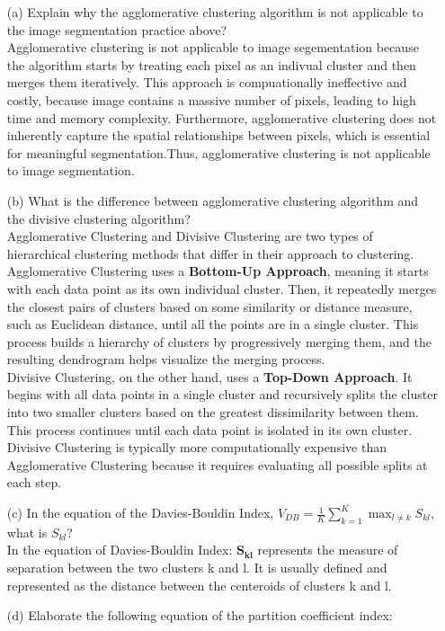 \documentclass[12pt,letterpaper]{article}
\begin{document}
\begin{itemize}
    \item[(a)] Explain why the agglomerative clustering algorithm is not applicable to the image segmentation practice above?
    \vspace{0.2in}
    \\ Agglomerative clustering is not applicable to image segementation because the algorithm starts by treating each pixel as an indivual 
    cluster and then merges them iteratively. This approach is compuationally ineffective and costly, because image contains a massive number of pixels,
    leading to high time and memory complexity. Furthermore, agglomerative clustering does not inherently capture the spatial relationships between pixels, which is
    essential for meaningful segmentation.Thus, agglomerative clustering is not applicable to image segmentation.

    \item[(b)] What is the difference between agglomerative clustering algorithm and the divisive clustering algorithm?
    \vspace{0.2in}
    \\ Agglomerative Clustering and Divisive Clustering are two types of hierarchical clustering methods that differ in their approach to clustering. Agglomerative Clustering uses a \textbf{Bottom-Up Approach}, meaning it starts with each data point as its own individual cluster. Then, it repeatedly merges the closest pairs of clusters based on some similarity or distance measure, such as Euclidean distance, until all the points are in a single cluster. This process builds a hierarchy of clusters by progressively merging them, and the resulting dendrogram helps visualize the merging process. 
    \vspace{0.2in}
    \\ Divisive Clustering, on the other hand, uses a \textbf{Top-Down Approach}. It begins with all data points in a single cluster and recursively splits the cluster into two smaller clusters based on the greatest dissimilarity between them. This process continues until each data point is isolated in its own cluster. Divisive Clustering is typically more computationally expensive than Agglomerative Clustering because it requires evaluating all possible splits at each step. 
    
    
    \item[(c)] In the equation of the Davies-Bouldin Index, \(V_{DB} = \frac{1}{K}\sum_{k=1}^{K} \max_{l\neq k} S_{kl}\), what is \(S_{kl}\)?
    \vspace{0.2in}
    \\ In the equation of Davies-Bouldin Index: \(\mathbf{S_{kl}}\) represents the measure of separation between the two clusters k and l. It is usually defined and represented as the distance between the centeroids of clusters k and l.
    \item[(d)] Elaborate the following equation of the partition coefficient index:


\end{itemize}
\end{document}
